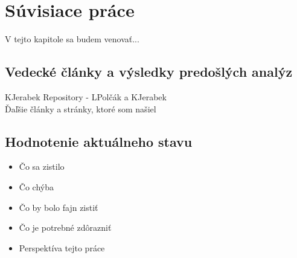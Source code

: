 \chapter{Súvisiace práce}
\label{related-work}

V tejto kapitole sa budem venovať...


\section{Vedecké články a výsledky predošlých analýz}

KJerabek Repository - LPolčák a KJerabek \cite{nel-http-archive}\cite{dp-security-issues-nel}
\\
Ďaľšie články a stránky, ktoré som našiel

\section{Hodnotenie aktuálneho stavu}

\begin{itemize}
\item Čo sa zistilo
\item Čo chýba
\item Čo by bolo fajn zistiť
\item Čo je potrebné zdôrazniť
\item Perspektíva tejto práce
\end{itemize}
